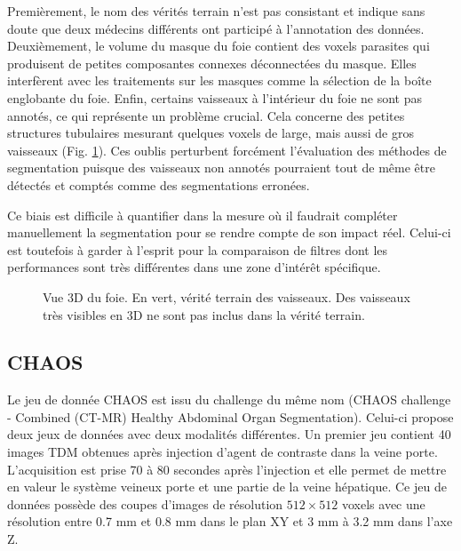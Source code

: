 Premièrement, le nom des vérités terrain n'est pas consistant et indique sans doute que deux médecins différents ont participé à l'annotation des données. Deuxièmement, le volume du masque du foie contient des voxels parasites qui produisent de petites composantes connexes déconnectées du masque. Elles interfèrent avec les traitements sur les masques comme la sélection de la boîte englobante du foie.
 Enfin, certains vaisseaux à l'intérieur du foie ne sont pas annotés, ce qui représente un problème crucial. Cela concerne des petites structures tubulaires mesurant quelques voxels de large, mais aussi de gros vaisseaux (Fig. \ref{fig:missing_annotations}). Ces oublis perturbent forcément l'évaluation des méthodes de segmentation puisque des vaisseaux non annotés pourraient tout de même être détectés et comptés comme des segmentations erronées. 

Ce biais est difficile à quantifier dans la mesure où il faudrait compléter manuellement la segmentation pour se rendre compte de son impact réel. Celui-ci est toutefois à garder à l'esprit pour la comparaison de filtres dont les performances sont très différentes dans une zone d'intérêt spécifique.
\begin{figure}
    \centering
    \caption{Vue 3D du foie. En vert, vérité terrain des vaisseaux. Des vaisseaux très visibles en 3D ne sont pas inclus dans la vérité terrain.}
    \label{fig:missing_annotations}
\end{figure}
\subsection{CHAOS}
Le jeu de donnée CHAOS est issu du challenge du même nom (CHAOS challenge - Combined (CT-MR) Healthy Abdominal Organ Segmentation). Celui-ci propose deux jeux de données avec deux modalités différentes. Un premier jeu contient 40 images TDM obtenues après injection d'agent de contraste dans la veine porte. L'acquisition est prise 70 à 80 secondes après l'injection et elle permet de mettre en valeur le système veineux porte et une partie de la veine hépatique. Ce jeu de données possède des coupes d'images de résolution $512\times 512$ voxels avec une résolution entre 0.7 mm et 0.8 mm dans le plan XY et 3 mm à 3.2 mm dans l'axe Z.

